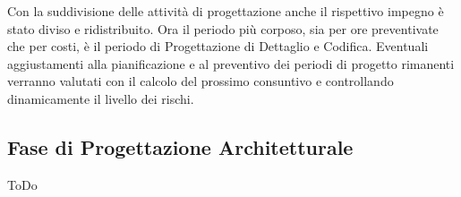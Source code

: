 \documentclass[a4paper,11pt]{article}
\begin{document}
	Con la suddivisione delle attività di progettazione anche il rispettivo impegno è stato diviso e ridistribuito. Ora il periodo più corposo, sia per ore preventivate che per costi, è il periodo di Progettazione di Dettaglio e Codifica. Eventuali aggiustamenti alla pianificazione e al preventivo dei periodi di progetto rimanenti verranno valutati con il calcolo del prossimo consuntivo e controllando dinamicamente il livello dei rischi.
	
	\newpage
	
	\subsection{Fase di Progettazione Architetturale}
	ToDo	
	
\end{document}
